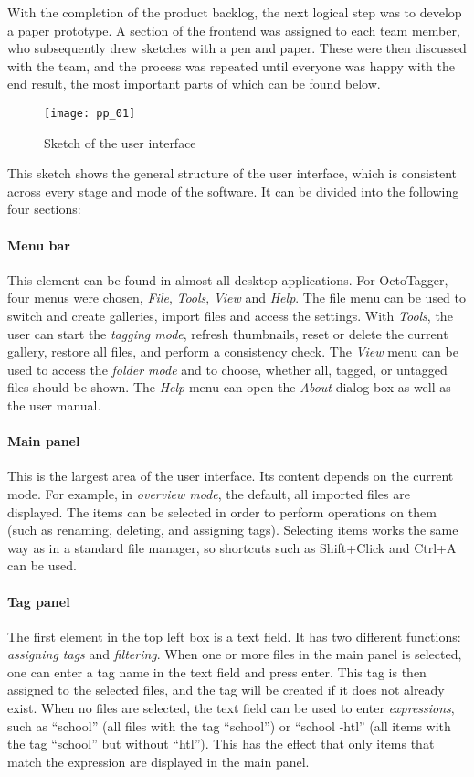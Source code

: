 With the completion of the product backlog, the next logical step was to
develop a paper prototype. A section of the frontend was assigned to each team
member, who subsequently drew sketches with a pen and paper. These were then
discussed with the team, and the process was repeated until everyone was happy
with the end result, the most important parts of which can be found below.

\begin{figure}[H]
	\centering
	\texttt{[image: pp\_01]}
	\caption{Sketch of the user interface}
\end{figure}

This sketch shows the general structure of the user interface, which is
consistent across every stage and mode of the software. It can be divided into
the following four sections:

\paragraph{Menu bar} This element can be found in almost all desktop
applications. For OctoTagger, four menus were chosen, \emph{File},
\emph{Tools}, \emph{View} and \emph{Help}. The file menu can be used to switch
and create galleries, import files and access the settings. With \emph{Tools}, the
user can start the \emph{tagging mode}, refresh thumbnails, reset or delete the
current gallery, restore all files, and perform a consistency check.  The \emph{View}
menu can be used to access the \emph{folder mode} and to choose, whether all,
tagged, or untagged files should be shown. The \emph{Help} menu can open the \emph{About}
dialog box as well as the user manual.

\paragraph{Main panel} This is the largest area of the user interface. Its content
depends on the current mode. For example, in \emph{overview mode}, the default,
all imported files are displayed. The items can be selected in order to perform
operations on them (such as renaming, deleting, and assigning tags). Selecting
items works the same way as in a standard file manager, so shortcuts
such as Shift+Click and Ctrl+A can be used. %

\paragraph{Tag panel} The first element in the top left box is a text field. It
has two different functions: \emph{assigning tags} and \emph{filtering}.  When
one or more files in the main panel is selected, one can enter a tag name in
the text field and press enter. This tag is then assigned to the selected
files, and the tag will be created if it does not already exist. When no files
are selected, the text field can be used to enter \emph{expressions}, such as
``school'' (all files with the tag ``school'') or ``school -htl'' (all items
with the tag ``school'' but without ``htl''). This has the effect that only
items that match the expression are displayed in the main panel.

